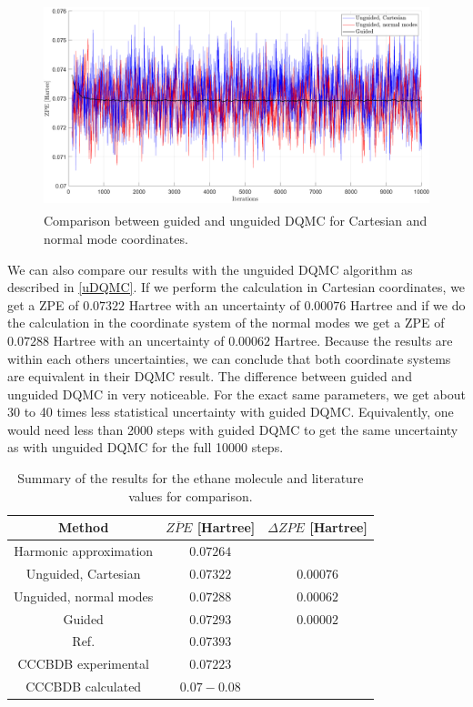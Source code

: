 \documentclass [12pt]{report}
\begin{document}
\begin{figure}[h!]
\includegraphics[width=\linewidth, height=6cm] {c2h6_2.png}
\caption{Comparison between guided and unguided DQMC for Cartesian and normal mode coordinates.} \label{c2h6_2}
\end{figure}
We can also compare our results with the unguided DQMC algorithm as described in \ref{uDQMC}. If we perform the calculation in Cartesian coordinates, we get a ZPE of $0.07322$ Hartree with an uncertainty of $0.00076$ Hartree and if we do the calculation in the coordinate system of the normal modes we get a ZPE of $0.07288$ Hartree with an uncertainty of $0.00062$ Hartree. Because the results are within each others uncertainties, we can conclude that both coordinate systems are equivalent in their DQMC result. The difference between guided and unguided DQMC in very noticeable. For the exact same parameters, we get about 30 to 40 times less statistical uncertainty with guided DQMC. Equivalently, one would need less than 2000 steps with guided DQMC to get the same uncertainty as with unguided DQMC for the full 10000 steps.

\begin{table}[h]
\centering
 \begin{tabular}{||c | c | c||} 
 \hline
 Method & $\overline{ZPE}$ [Hartree] & $\Delta ZPE$ [Hartree] \\ [0.5ex] 
 \hline\hline
 Harmonic approximation & $0.07264$ & \\
 \hline
 Unguided, Cartesian & $0.07322$ &  $0.00076$\\
  \hline
 Unguided, normal modes & $0.07288$ &  $0.00062$\\
 \hline
 Guided & $0.07293$ & $0.00002$ \\
 \hline
 Ref. \cite{c2h6} & $0.07393$ &\\
 \hline
 CCCBDB experimental \cite{cccbdb} & $0.07223$ & \\
 \hline
 CCCBDB calculated \cite{cccbdb} & $0.07 - 0.08$ & \\
 \hline
\end{tabular}
\caption{Summary of the results for the ethane molecule and literature values for comparison.}
\end{table}
\end{document}
